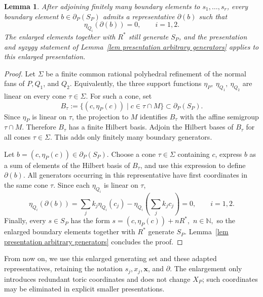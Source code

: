 \documentclass[11pt]{amsart}
\numberwithin{equation}{section}
\theoremstyle{plain}
\newtheorem{lemma}[theorem]{Lemma}
\theoremstyle{definition}
\newcommand{\0}{$0$-mutable}
\newcommand{\NN}{\ensuremath{\mathbb{N}}}
\newcommand{\bfx}{\ensuremath{\mathbf{x}}}
\renewcommand{\1}{$1$-rigid}
\renewcommand{\0}{$0$-mutable}
\begin{document}
\begin{lemma}\label{lem adapted boundary representatives}
After adjoining finitely many boundary elements to
\(s_1,\ldots,s_r\), every boundary element
\(b\in\partial_P(S_P)\) admits a representative \(\partial(b)\) such
that
\begin{equation}\label{eq adapted boundary vanishing}
\eta_{Q_i}(\partial(b))=0,
\qquad i=1,2.
\end{equation}
The enlarged elements together with \(R^*\) still generate \(S_P\),
and the presentation and syzygy statement of
Lemma~\ref{lem presentation arbitrary generators} applies to this
enlarged presentation.
\end{lemma}

\begin{proof}
Let \(\Sigma\) be a finite common rational polyhedral refinement of the
normal fans of \(P,Q_1\), and \(Q_2\). Equivalently, the three support
functions
$
\eta_P,~\eta_{Q_1},~ \eta_{Q_2}
$
are linear on every cone \(\tau\in\Sigma\). For such a cone, set
\[
B_\tau
:=
\bigl\{(c,\eta_P(c))\mid c\in\tau\cap M\bigr\}
\subset\partial_P(S_P).
\]
Since \(\eta_P\) is linear on \(\tau\), the projection to \(M\)
identifies \(B_\tau\) with the affine semigroup \(\tau\cap M\).
Therefore \(B_\tau\) has a finite Hilbert basis. Adjoin the Hilbert
bases of \(B_\tau\) for all cones \(\tau\in\Sigma\). This adds only
finitely many boundary generators.

Let
\(b=(c,\eta_P(c))\in\partial_P(S_P)\). Choose a cone
\(\tau\in\Sigma\) containing \(c\), express \(b\) as a sum of elements
of the Hilbert basis of \(B_\tau\), and use this expression to define
\(\partial(b)\). All generators occurring in this representative have
first coordinates in the same cone \(\tau\). Since each
\(\eta_{Q_i}\) is linear on \(\tau\),
\[
\eta_{Q_i}(\partial(b))
=
\sum_j k_j\eta_{Q_i}(c_j)
-
\eta_{Q_i}\left(\sum_jk_jc_j\right)
=
0,
\qquad i=1,2.
\]
Finally, every \(s\in S_P\) has the form
$
s=(c,\eta_P(c))+nR^*,
$
$ 
n\in\NN,
$
so the enlarged boundary elements together with \(R^*\) generate
\(S_P\). Lemma~\ref{lem presentation arbitrary generators} concludes the proof.
\end{proof}

From now on, we use this enlarged generating set and these adapted
representatives, retaining the notation \(s_j,x_j,\bfx\), and
\(\partial\). The enlargement only introduces redundant toric
coordinates and does not change \(X_P\); such coordinates may be
eliminated in explicit smaller presentations.
\end{document}
